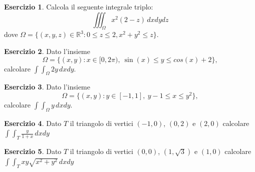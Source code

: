\documentclass[12pt,a4paper]{article}
\theoremstyle{definition}
\newtheorem{exe}{Esercizio}
\begin{document}
\begin{exe}
    Calcola il seguente integrale triplo:
    \[ \iiint_\Omega x^2(2-z) \, dx dy dz \]
    dove $\Omega = \{(x,y,z) \in \mathbb{R}^3 : 0 \leq z \leq 2, x^2+y^2 \leq z\}$.
\end{exe}

\begin{exe}
    Dato l'insieme
    \[ \Omega = \{(x, y) : x \in [0, 2\pi), \  \sin(x) \le y \le cos(x) + 2\},
    \]
    calcolare $\int \int _{\Omega} 2y \, dx dy$.
\end{exe}

\begin{exe}
    Dato l'insieme
    \[ \Omega = \{(x, y) : y \in [-1, 1], \  y-1 \le x \le y^2\},
    \]
    calcolare $\int \int _{\Omega} y \, dx dy$.
\end{exe}
\begin{exe}
    Dato $T$ il triangolo di vertici $(-1, 0)$, $(0, 2)$ e $(2,0)$ calcolare $\int \int_{T} \frac{y}{1+x}\, dx dy$
\end{exe}
\begin{exe}
    Dato $T$ il triangolo di vertici $(0, 0)$, $(1, \sqrt{3})$ e $(1,0)$ calcolare $\int \int_{T} xy \sqrt{x^2 + y^2}\, dx dy$
\end{exe}
\end{document}
